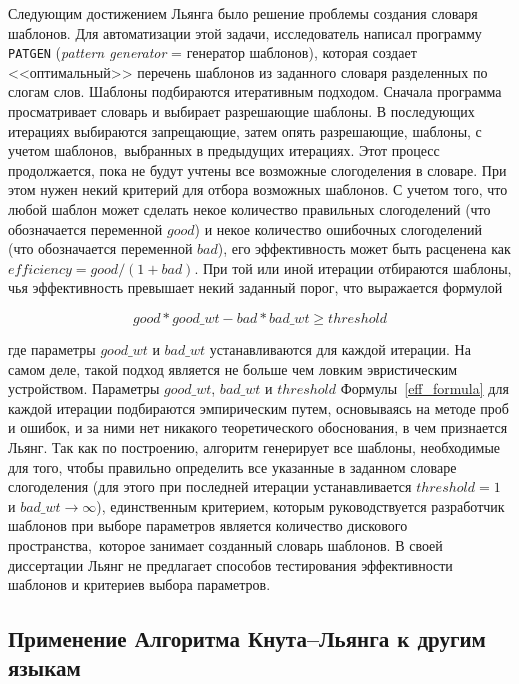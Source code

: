 \documentclass[12pt,a4paper,oneside]{extarticle}
\begin{document}
Следующим достижением Льянга было решение проблемы создания словаря шаблонов. Для автоматизации этой задачи, исследователь написал программу \verb+PATGEN+ (\emph{pattern generator} = генератор шаблонов), которая создает <<оптимальный>> перечень шаблонов из заданного словаря разделенных по слогам слов. Шаблоны подбираются итеративным подходом. Сначала программа просматривает словарь и выбирает разрешающие шаблоны. В последующих итерациях выбираются запрещающие, затем опять разрешающие, шаблоны, с учетом шаблонов, выбранных в предыдущих итерациях. Этот процесс продолжается, пока не будут учтены все возможные слогоделения в словаре. При этом нужен некий критерий для отбора возможных шаблонов. С учетом того, что любой шаблон может сделать некое количество правильных слогоделений (что обозначается переменной $good$) и некое количество ошибочных слогоделений (что обозначается переменной $bad$), его эффективность может быть расценена как $efficiency = good / (1 + bad)$. При той или иной итерации отбираются шаблоны, чья эффективность превышает некий заданный порог, что выражается формулой

\begin{equation}
\label{eff_formula}
good * good\_wt - bad * bad\_wt \geq threshold
\end{equation}

\noindent где параметры $good\_wt$ и $bad\_wt$ устанавливаются для каждой итерации. На самом деле, такой подход является не больше чем ловким эвристическим устройством. Параметры $good\_wt$, $bad\_wt$ и $threshold$ Формулы~\ref{eff_formula} для каждой итерации подбираются эмпирическим путем, основываясь на методе проб и ошибок, и за ними нет никакого теоретического обоснования, в чем признается Льянг\autocite[Ср.: <<We do not have any theoretical justification for these parameters; they just seem to work well>>.][p.~36]{liang1983}. Так как по построению, алгоритм генерирует все шаблоны, необходимые для того, чтобы правильно определить все указанные в заданном словаре слогоделения (для этого при последней итерации устанавливается $threshold = 1$ и $bad\_wt \rightarrow \infty$), единственным критерием, которым руководствуется разработчик шаблонов при выборе параметров является количество дискового пространства, которое занимает созданный словарь шаблонов. В своей диссертации Льянг не предлагает способов тестирования эффективности шаблонов и критериев выбора параметров.

\subsection{Применение Алгоритма Кнута--Льянга к другим языкам}
\end{document}
